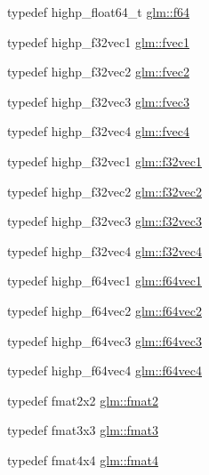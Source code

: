 \begin{DoxyCompactItemize}
\item 
typedef highp\+\_\+float64\+\_\+t \hyperlink{group__gtc__type__precision_ga2bba392e555124b36cde6abba349bab3}{glm\+::f64}
\item 
typedef highp\+\_\+f32vec1 \hyperlink{group__gtc__type__precision_gaa732e5d06540922c44d3e35f32d6e948}{glm\+::fvec1}
\item 
typedef highp\+\_\+f32vec2 \hyperlink{group__gtc__type__precision_ga83fb34639f810d0c9240cf7ff0180e20}{glm\+::fvec2}
\item 
typedef highp\+\_\+f32vec3 \hyperlink{group__gtc__type__precision_ga8480fdaa7fb8e177e57b367be79863d8}{glm\+::fvec3}
\item 
typedef highp\+\_\+f32vec4 \hyperlink{group__gtc__type__precision_ga396c4084cd7e5465f8b56035e0420c3e}{glm\+::fvec4}
\item 
typedef highp\+\_\+f32vec1 \hyperlink{group__gtc__type__precision_ga6fb588b465f2252b473582159c31c40c}{glm\+::f32vec1}
\item 
typedef highp\+\_\+f32vec2 \hyperlink{group__gtc__type__precision_ga8681dee3524dea86388178c49c27079a}{glm\+::f32vec2}
\item 
typedef highp\+\_\+f32vec3 \hyperlink{group__gtc__type__precision_gab550330e62a7bc3fa9e6740b9421037c}{glm\+::f32vec3}
\item 
typedef highp\+\_\+f32vec4 \hyperlink{group__gtc__type__precision_ga6848e3b5cb5c1f4c117717b309e726eb}{glm\+::f32vec4}
\item 
typedef highp\+\_\+f64vec1 \hyperlink{group__gtc__type__precision_ga4c945cd13adbebd25ea3df003efb92ef}{glm\+::f64vec1}
\item 
typedef highp\+\_\+f64vec2 \hyperlink{group__gtc__type__precision_gacde4fe7b129521888cd30672c34650c5}{glm\+::f64vec2}
\item 
typedef highp\+\_\+f64vec3 \hyperlink{group__gtc__type__precision_gac531875c6544b7919f36a86cbe538736}{glm\+::f64vec3}
\item 
typedef highp\+\_\+f64vec4 \hyperlink{group__gtc__type__precision_ga9d896f484039b22873e7bfb9e06f7b47}{glm\+::f64vec4}
\item 
typedef fmat2x2 \hyperlink{group__gtc__type__precision_gab8e1ce0a2648cfcd645eed2d8ea96f21}{glm\+::fmat2}
\item 
typedef fmat3x3 \hyperlink{group__gtc__type__precision_ga17dec8b2e3d19b235b0749b8ac9f2217}{glm\+::fmat3}
\item 
typedef fmat4x4 \hyperlink{group__gtc__type__precision_ga5a7b9713c32b3e8bf6ad41fce25f3205}{glm\+::fmat4}
\item 

\end{DoxyCompactItemize}
